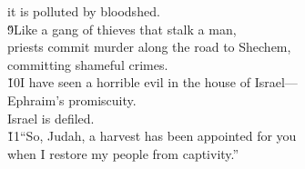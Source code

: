 \begin{poetry}
\poemll    it is polluted by bloodshed. \\
\poeml \v{9}Like a gang of thieves that stalk a man, \\
\poemll    priests commit murder along the road to Shechem, \\
\poemlll       committing shameful crimes. \\
\poeml \v{10}I have seen a horrible evil in the house of Israel--- \\
\poemll    Ephraim's promiscuity. \\
\poemlll       Israel is defiled. \\
\poeml \v{11}``So, Judah, a harvest has been appointed for you \\
\poemll    when I restore my people from captivity.''
\end{poetry}

